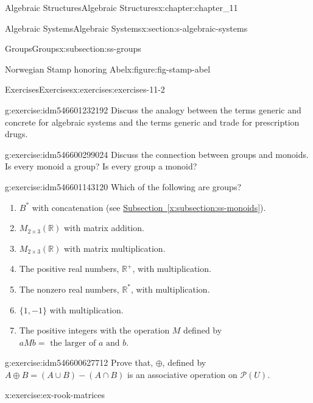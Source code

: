 \documentclass[oneside,10pt,]{book}
\newcommand{\xreffont}{\relax}
\numberwithin{equation}{section}
\begin{document}
\begin{chapterptx}{Algebraic Structures}{}{Algebraic Structures}{}{}{x:chapter:chapter_11}
\begin{sectionptx}{Algebraic Systems}{}{Algebraic Systems}{}{}{x:section:s-algebraic-systems}
\begin{subsectionptx}{Groups}{}{Groups}{}{}{x:subsection:ss-groups}
\begin{figureptx}{Norwegian Stamp honoring Abel}{x:figure:fig-stamp-abel}{}
\tcblower
\end{figureptx}%
\end{subsectionptx}
%
%
\typeout{************************************************}
\typeout{************************************************}
%
\begin{exercises-subsection}{Exercises}{}{Exercises}{}{}{x:exercises:exercises-11-2}
\begin{divisionexercise}{1}{}{}{g:exercise:idm546601232192}%
Discuss the analogy between the terms generic and concrete for algebraic systems and the terms generic and trade for prescription drugs.%
\end{divisionexercise}%
\begin{divisionexercise}{2}{}{}{g:exercise:idm546600299024}%
Discuss the connection between groups and monoids. Is every monoid a group? Is every group a monoid?%
\end{divisionexercise}%
\begin{divisionexercise}{3}{}{}{g:exercise:idm546601143120}%
Which of the following are groups?%
\begin{enumerate}[label=(\alph*)]
\item{}\(B^*\) with concatenation (see \hyperref[x:subsection:ss-monoids]{Subsection~{\xreffont\ref{x:subsection:ss-monoids}}}).%
\item{}\(M_{2\times 3}(\mathbb{R})\) with matrix addition.%
\item{}\(M_{2\times 3}(\mathbb{R})\) with matrix multiplication.%
\item{}The positive real numbers, \(\mathbb{R}^+\), with multiplication.%
\item{}The nonzero real numbers, \(\mathbb{R}^*\), with multiplication.%
\item{}\(\{1, -1\}\) with multiplication.%
\item{}The positive integers with the operation \(M\) defined by \(a M b = \textrm{ the larger of } a \textrm{ and } b\).%
\end{enumerate}
%
\end{divisionexercise}%
\begin{divisionexercise}{4}{}{}{g:exercise:idm546600627712}%
Prove that, \(\oplus\), defined by \(A \oplus  B = (A \cup  B) - (A \cap  B)\) is an associative operation on \(\mathcal{P}(U)\).%
\end{divisionexercise}%
\begin{divisionexercise}{5}{}{}{x:exercise:ex-rook-matrices}%

\end{divisionexercise}
\end{exercises-subsection}
\end{sectionptx}
\end{chapterptx}
\end{document}
